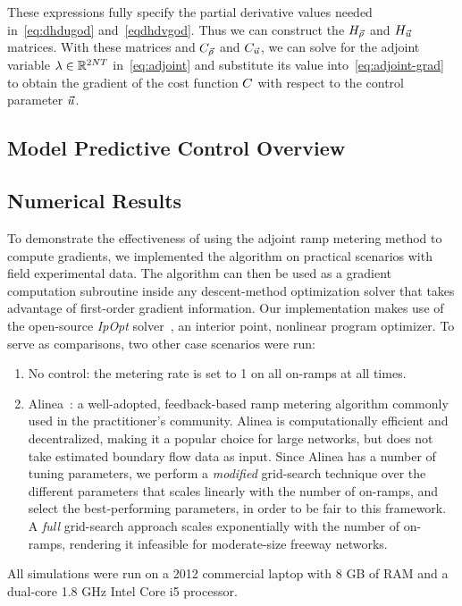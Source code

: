 These expressions fully specify the partial derivative values needed
in~\eqref{eq:dhdugod} and~\eqref{eqdhdvgod}. Thus we can construct
the $H_{\vec{\rho}}$ and $H_{\vec{u}}$ matrices. With these matrices and $C_{\vec{\rho}}$ and
$C_{\vec{u}}$, we can solve for the adjoint variable $\lambda\in\mathbb{R}^{2NT}$
in~\eqref{eq:adjoint} and substitute its value into~\eqref{eq:adjoint-grad}
to obtain the gradient of the cost function $C$ with respect
to the control parameter $\vec{u}$.

\subsection{Model Predictive Control Overview}
\label{sec:model-predictive-control-overview-adjoint-section}



\subsection{Numerical Results}
\label{sec:numerical-results-adjoint}

To demonstrate the effectiveness of using the adjoint ramp metering
method to compute gradients, we implemented the algorithm on practical scenarios with field experimental data.
The algorithm can then be used as a gradient computation subroutine
inside any descent-method optimization solver that takes advantage
of first-order gradient information. Our implementation makes use
of the open-source \emph{IpOpt} solver~\cite{Andreas2005}, an interior point, nonlinear program optimizer. To serve
as comparisons, two other case scenarios were run:
\begin{enumerate}
\item No control: the metering rate is set to 1 on all on-ramps at all times.
\item Alinea~\cite{Papageorgiou1991Alinea}: a well-adopted, feedback-based ramp metering
algorithm commonly used in the practitioner's community. Alinea is computationally efficient and decentralized,
making it a popular choice for large networks, but does not take estimated
boundary flow data as input. Since Alinea has a number of tuning parameters,
we perform a \emph{modified} grid-search technique over the different
parameters that scales linearly with the number of on-ramps, and select
the best-performing parameters, in order to be fair to this framework. A \emph{full} grid-search approach
scales exponentially with the number of on-ramps, rendering it infeasible
for moderate-size freeway networks.
\end{enumerate}
All simulations were run on a 2012 commercial laptop with 8 GB of RAM and a dual-core 1.8 GHz Intel Core i5 processor.

